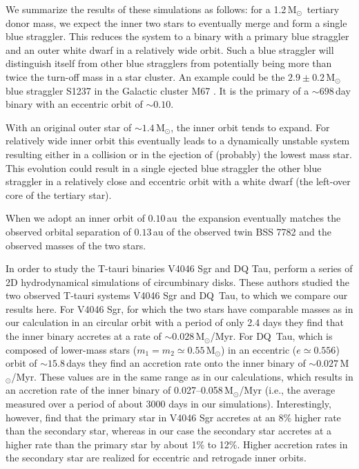 \documentclass{aastex62}
\newcommand{\MSun}{\mbox{M$_\odot$}}
\begin{document}
We summarize the results of these simulations as follows: for a
1.2\,\MSun\, tertiary donor mass, we expect the inner two stars to
eventually merge and form a single blue straggler. This reduces the
system to a binary with a primary blue straggler and an outer white
dwarf in a relatively wide orbit. Such a blue straggler will
distinguish itself from other blue stragglers from potentially
being more than twice the turn-off mass in a star cluster.  An
example could be the $2.9\pm0.2$\,\MSun\, blue straggler S1237 in the
Galactic cluster M67 \cite{2016ApJ...832L..13L}. It is the primary of
a $\sim 698$\,day binary with an eccentric orbit of $\sim 0.10$.

With an original outer star of $\sim 1.4$\,\MSun, the inner orbit
tends to expand. For relatively wide inner orbit this eventually leads
to a dynamically unstable system resulting either in a collision or in
the ejection of (probably) the lowest mass star. This evolution could
result in a single ejected blue straggler the other blue straggler in
a relatively close and eccentric orbit with a white dwarf (the
left-over core of the tertiary star).

When we adopt an inner orbit of $0.10$\,au\, the expansion eventually
matches the observed orbital separation of $0.13$\,au of the observed
twin BSS 7782 and the observed masses of the two stars.

In order to study the T-tauri binaries V4046 Sgr and DQ Tau,
\cite{2011MNRAS.413.2679D} perform a series of 2D hydrodynamical
simulations of circumbinary disks.  These authors studied the two
observed T-tauri systems V4046 Sgr and DQ~Tau, to which we compare our
results here.  For V4046 Sgr, for which the two stars have comparable
masses as in our calculation in an circular orbit with a period of
only 2.4 days they find that the inner binary accretes at a rate of
$\sim 0.028$\,\MSun/Myr.  For DQ~Tau, which is composed of lower-mass
stars ($m_1 = m_2 \simeq 0.55$\,\MSun) in an eccentric ($e\simeq
0.556$) orbit of $\sim 15.8$\,days they find an accretion rate onto
the inner binary of $\sim 0.027$\,\MSun/Myr.  These values are in the
same range as in our calculations, which results in an accretion rate
of the inner binary of 0.027--0.058\,\MSun/Myr (i.e., the average
measured over a period of about 3000 days in our simulations).
Interestingly, however, \cite{2011MNRAS.413.2679D} find that the
primary star in V4046 Sgr accretes at an 8\% higher rate than the
secondary star, whereas in our case the secondary star accretes at a
higher rate than the primary star by about 1\% to 12\%.  Higher
accretion rates in the secondary star are realized for eccentric and
retrogade inner orbits.
\end{document}
